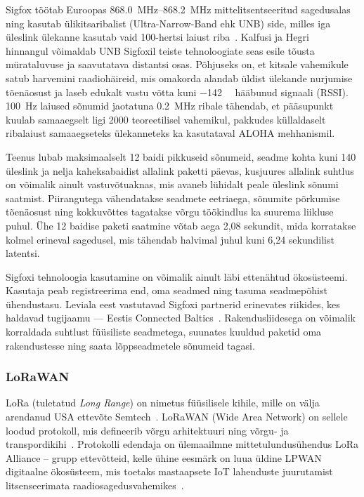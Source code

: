 \documentclass[12pt]{article}
\begin{document}
Sigfox töötab Euroopas \SIrange{868.0}{868.2}{\mega\hertz} mittelitsentseeritud sagedusalas ning kasutab ülikitsaribalist (Ultra-Narrow-Band ehk UNB) side, milles iga üleslink ülekanne kasutab vaid 100-hertsi laiust riba~\cite{sigfoxtech}.
Kalfusi ja Hegri~\cite{kalfus2016ultra} hinnangul võimaldab UNB Sigfoxil teiste tehnoloogiate seas esile tõusta mürataluvuse ja saavutatava distantsi osas.
Põhjuseks on, et kitsale vahemikule satub harvemini raadiohäireid, mis omakorda alandab üldist ülekande nurjumise tõenäosust ja laseb edukalt vastu võtta kuni \SI{-142}{\deci\belm} hääbunud signaali (RSSI).
\SI{100}{\hertz} laiused sõnumid jaotatuna \SI{0,2}{\mega\hertz} ribale tähendab, et pääsupunkt kuulab samaaegselt ligi 2000 teoreetilisel vahemikul, pakkudes küllaldaselt ribalaiust samaaegseteks ülekanneteks ka kasutataval ALOHA mehhanismil.

Teenus lubab maksimaalselt 12 baidi pikkuseid sõnumeid, seadme kohta kuni 140 üleslink ja nelja kaheksabaidist allalink paketti päevas, kusjuures allalink suhtlus on võimalik ainult vastuvõtuaknas, mis avaneb lühidalt peale üleslink sõnumi saatmist.
Piirangutega vähendatakse seadmete eetriaega, sõnumite põrkumise tõenäosust ning kokkuvõttes tagatakse võrgu töökindlus ka suurema liikluse puhul.
Ühe 12 baidise paketi saatmine võtab aega 2,08 sekundit, mida korratakse kolmel erineval sagedusel, mis tähendab halvimal juhul kuni 6,24 sekundilist latentsi.

Sigfoxi tehnoloogia kasutamine on võimalik ainult läbi ettenähtud ökosüsteemi.
Kasutaja peab registreerima end, oma seadmed ning tasuma seadmepõhist ühendustasu.
Leviala eest vastutavad Sigfoxi partnerid erinevates riikides, kes haldavad tugijaamu — Eestis Connected Baltics~\cite{sfCoverage}.
Rakendusliidesega on võimalik korraldada suhtlust füüsiliste seadmetega, suunates kuuldud paketid oma rakendustesse ning saata lõppseadmetele sõnumeid tagasi.

\subsubsection{LoRaWAN}

LoRa (tuletatud \textit{Long Range}) on nimetus füüsilisele kihile, mille on välja arendanud USA ettevõte Semtech~\cite{loraIntro}.
LoRaWAN (Wide Area Network) on sellele loodud protokoll, mis defineerib võrgu arhitektuuri ning võrgu- ja transpordikihi~\cite{lorawanIntro}.
Protokolli edendaja on ülemaailmne mittetulundusühendus LoRa Alliance -- grupp ettevõtteid, kelle ühine eesmärk on luua üldine LPWAN digitaalne ökosüsteem, mis toetaks mastaapsete IoT lahenduste juurutamist litsenseerimata raadiosagedusvahemikes~\cite{loraalliance}.
\end{document}
